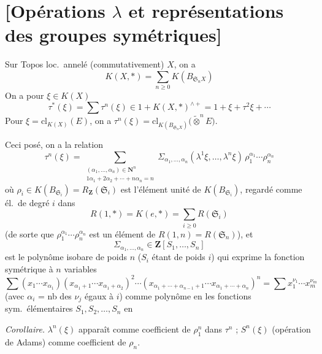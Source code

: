 \documentclass[11pt,a4paper]{article}
\begin{document}
\section{[Opérations $\lambda$ et représentations des groupes symétriques]}

Sur Topos loc.\ annelé (commutativement) $X$, on a
\[
  K(X, *) = \sum_{n \geqslant 0} K(B_{\mathfrak{S}_n X})
\]
On a pour $\xi \in K(X)$
\[
  \tau^*(\xi) = \sum \tau^n(\xi) \in 1 + K(X, *)^{\wedge +}
  = 1 + \xi + \tau^2\xi + \cdots
\]
Pour $\xi = \mathrm{cl}_{K(X)}(E)$, on a
$\tau^n(\xi) = \mathrm{cl}_{K(B_{\mathfrak{S}_n X})}
\bigl(\widetilde{\otimes}^{n} E\bigr)$.

Ceci posé, on a la relation
\[
  \tau^n(\xi) =
  \sum_{\substack{(\alpha_1, \ldots, \alpha_n) \in \mathbf{N}^n \\
  1\alpha_1 + 2\alpha_2 + \cdots + n\alpha_n = n}}
  \Sigma_{\alpha_1, \ldots, \alpha_n}(\lambda^1\xi, \ldots, \lambda^n\xi)\,
  \rho_1^{\alpha_1} \cdots \rho_n^{\alpha_n}
\]
où $\rho_i \in K(B_{\mathfrak{S}_i}) = R_{\mathbf{Z}}(\mathfrak{S}_i)$ est
l'élément unité de $K(B_{\mathfrak{S}_i})$, regardé comme él.\ de degré $i$
dans
\[
  R(1, *) = K(e, *) = \sum_{i \geqslant 0} R(\mathfrak{S}_i)
\]
(de sorte que $\rho_1^{\alpha_1} \cdots \rho_n^{\alpha_n}$ est un élément de
$R(1, n) = R(\mathfrak{S}_n)$), et 
\[
  \Sigma_{\alpha_1, \ldots, \alpha_n} \in \mathbf{Z}[S_1, \ldots, S_n]
\]
est le polynôme isobare de poids $n$ ($S_i$ étant de poids $i$) qui
exprime la fonction symétrique à $n$ variables
\[
  \sum (x_1 \cdots x_{\alpha_1})(x_{\alpha_1 + 1} \cdots
  x_{\alpha_1 + \alpha_2})^2 \cdots
  (x_{\alpha_1 + \cdots + \alpha_{n-1} + 1} \cdots
  x_{\alpha_1 + \cdots + \alpha_n})^n
  = \sum x_1^{\nu_1} \cdots x_m^{\nu_m}
\]
(avec $\alpha_i$ = nb des $\nu_j$ égaux à $i$) comme polynôme en les fonctions
sym.\ élémentaires $S_1, S_2, \ldots, S_n$ en

\emph{Corollaire.}  $\lambda^n(\xi)$ apparaît comme coefficient
de $\rho_1^n$ dans $\tau^n$ ; $S^n(\xi)$ (opération de Adams) comme
coefficient de $\rho_n$.
\end{document}
